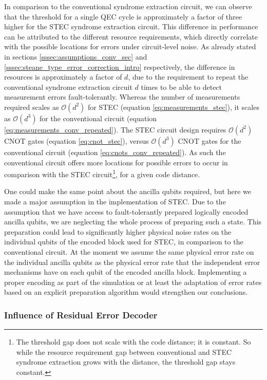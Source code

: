 In comparison to the conventional syndrome extraction circuit, we can observe that the threshold for a single QEC cycle is approximately a factor of three higher for the STEC syndrome extraction circuit.
This difference in performance can be attributed to the different resource requirements, which directly correlate with the possible locations for errors under circuit-level noise. 
As already stated in sections \ref{sssec:assumptions_conv_sec} and \ref{sssec:steane_type_error_correction_intro} respectively, 
the difference in resources is approximately a factor of $d$, due to the requirement to repeat the conventional syndrome extraction circuit $d$ times to be able to detect measurement errors fault-tolerantly.
Whereas the number of measurements required scales as $\mathcal{O}(d^2)$ for STEC (equation \eqref{eq:measurements_stec}), it scales as $\mathcal{O}(d^3)$ for the conventional circuit (equation \eqref{eq:measurements_conv_repeated}). 
The STEC circuit design requires $\mathcal{O}(d^2)$ CNOT gates (equation \eqref{eq:cnot_stec}), versus $\mathcal{O}(d^3)$ CNOT gates for the conventional circuit (equation \eqref{eq:cnots_conv_repeated}).
As such the conventional circuit offers more locations for possible errors to occur in comparison with the STEC circuit\footnote{
    The threshold gap does not scale with the code distance; it is constant.
    So while the resource requirement gap between conventional and STEC syndrome extraction grows with the distance, the threshold gap stays constant.
}, for a given code distance.

One could make the same point about the ancilla qubits required, 
but here we made a major assumption in the implementation of STEC.
Due to the assumption that we have access to fault-tolerantly prepared logically encoded ancilla qubits, 
we are neglecting the whole process of preparing such a state. 
This preparation could lead to significantly higher physical noise rates on the individual qubits of the encoded block used for STEC, 
in comparison to the conventional circuit.
At the moment we assume the same physical error rate on the individual ancilla qubits as the physical error rate that the independent error mechanisms have on each qubit of the encoded ancilla block. 
Implementing a proper encoding as part of the simulation or at least the adaptation of error rates based on an explicit preparation algorithm would strengthen our conclusions. 


\subsubsection*{Influence of Residual Error Decoder}\label{sssec:ml_ft_decoding}

